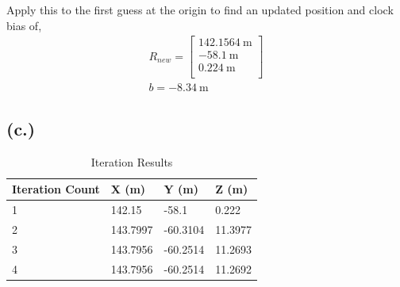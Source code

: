 \documentclass[11pt]{article}
\begin{document}
\hspace*{2em}Apply this to the first guess at the origin to find an updated position and clock bias of,
\begin{gather*}
    R_{new}=
    \begin{bmatrix}
        142.1564~\mathrm{m} \\
        -58.1~\mathrm{m}\\
        0.224~\mathrm{m} \\
    \end{bmatrix}
\\
    b = -8.34~\mathrm{m}
\end{gather*}

\subsection*{(c.)}
\begin{table}[h!]
\centering
\renewcommand{\arraystretch}{2}
\begin{tabular}{|p{2cm}|p{2cm}|p{2cm}|p{2cm}|}
\hline
Iteration Count & X (m) & Y (m) &Z (m) \\ \hline

1& 142.15& -58.1& 0.222\\ \hline

2& 143.7997 &  -60.3104&  11.3977\\ \hline

3& 143.7956& -60.2514& 11.2693\\ \hline

4& 143.7956& -60.2514& 11.2692\\ \hline

\end{tabular}
\caption{Iteration Results}
\label{tab:iteration_results}
\end{table}

\newpage
\end{document}
